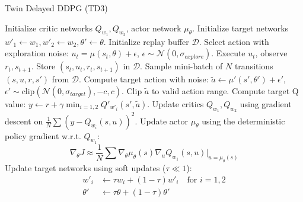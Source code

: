 \begin{frame}{Twin Delayed DDPG (TD3)}
    \begin{algorithm}[H]
        \captionsetup{font=scriptsize}
        \caption{Twin Delayed Deep Deterministic Policy Gradient}
        \begin{algorithmic}[1]
        \scriptsize
        \STATE Initialize critic networks $Q_{w_1}, Q_{w_2}$, actor network $\mu_{\theta}$.
        \STATE Initialize target networks $w'_1 \leftarrow w_1, w'_2 \leftarrow w_2, \theta' \leftarrow \theta$.
        \STATE Initialize replay buffer $\mathcal{D}$.
            \STATE Select action with exploration noise: $u_t = \mu(s_t, \theta) + \epsilon$, $\epsilon \sim \mathcal{N}(0, \sigma_{explore})$.
            \STATE Execute $u_t$, observe $r_t, s_{t+1}$. Store $(s_t, u_t, r_t, s_{t+1})$ in $\mathcal{D}$.
            \STATE Sample mini-batch of $N$ transitions $(s, u, r, s')$ from $\mathcal{D}$.
            \STATE Compute target action with noise: $\tilde{a} \leftarrow \mu'(s', \theta') + \epsilon'$, $\epsilon' \sim \text{clip}(\mathcal{N}(0, \sigma_{target}), -c, c)$. Clip $\tilde{a}$ to valid action range.
            \STATE Compute target Q value: $y \leftarrow r + \gamma \min_{i=1,2} Q'_{w'_i}(s', \tilde{a})$. 
            \STATE Update critics $Q_{w_1}, Q_{w_2}$ using gradient descent on $\frac{1}{N}\sum (y - Q_{w_i}(s, u))^2$.
                \STATE Update actor $\mu_\theta$ using the deterministic policy gradient w.r.t. $Q_{w_1}$:
                \[ \nabla_\theta J \approx \frac{1}{N} \sum \nabla_\theta \mu_\theta(s) \nabla_u Q_{w_1}(s, u)|_{u=\mu_\theta(s)} \]
                \STATE Update target networks using soft updates ($\tau \ll 1$):
                \begin{align*}
                    w'_i &\leftarrow \tau w_i + (1-\tau) w'_i \quad \text{for } i=1,2 \\
                    \theta' &\leftarrow \tau \theta + (1-\tau) \theta'
                \end{align*}
            \ENDIF
        \ENDFOR
        \end{algorithmic}
    \end{algorithm}
\end{frame}


